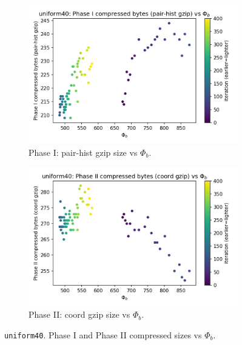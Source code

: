 \documentclass[11pt,a4paper]{article}
\numberwithin{equation}{section}
\newcommand{\phib}{\Phi_b}
\begin{document}
\begin{figure}[h!]
\centering
\begin{subfigure}[b]{0.48\textwidth}
\includegraphics[width=\textwidth]{figures/uniform40_phib_vs_phase1.png}
\caption{Phase I: pair-hist gzip size vs $\phib$.}
\end{subfigure}\hfill
\begin{subfigure}[b]{0.48\textwidth}
\includegraphics[width=\textwidth]{figures/uniform40_phib_vs_phase2.png}
\caption{Phase II: coord gzip size vs $\phib$.}
\end{subfigure}
\caption{\texttt{uniform40}. Phase I and Phase II compressed sizes vs $\phib$.}
\label{fig:uniform40_corr}
\end{figure}
\end{document}
